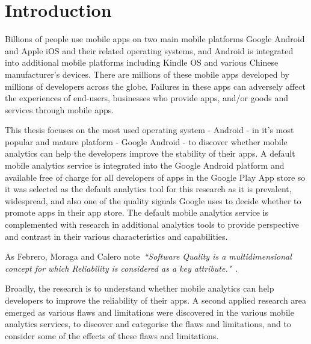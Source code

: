 \chapter{Introduction}
\label{the-introduction}

Billions of people use mobile apps on two main mobile platforms Google Android and Apple iOS and their related operating systems, and Android is integrated into additional mobile platforms including Kindle OS and various Chinese manufacturer's devices. There are millions of these mobile apps developed by millions of developers across the globe. Failures in these apps can adversely affect the experiences of end-users, businesses who provide apps, and/or goods and services through mobile apps. 

This thesis focuses on the most used operating system - Android - in it's most popular and mature platform - Google Android - to discover whether mobile analytics can help the developers improve the stability of their apps. A default mobile analytics service is integrated into the Google Android platform and available free of charge for all developers of apps in the Google Play App store so it was selected as the default analytics tool for this research as it is prevalent, widespread, and also one of the quality signals Google uses to decide whether to promote apps in their app store. The default mobile analytics service is complemented with research in additional analytics tools to provide perspective and contrast in their various characteristics and capabilities.


As Febrero, Moraga and Calero note~\emph{``Software Quality is a multidimensional concept for which Reliability is considered as a key attribute."}~\citep{febrero2017_software_reliability_as_user_perception}.

Broadly, the research is to understand whether mobile analytics can help developers to improve the reliability of their apps. A second applied research area emerged as various flaws and limitations were discovered in the various mobile analytics services, to discover and categorise the flaws and limitations, and to consider some of the effects of these flaws and limitations. 

